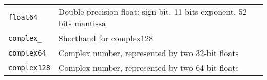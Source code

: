 \begin{table}
\begin{tabular}{ll}
        \verb|float64|    & Double-precision float: sign bit, 11 bits exponent, 52 bits mantissa                 \\
        \verb|complex_|   & Shorthand for complex128                                                             \\
        \verb|complex64|  & Complex number, represented by two 32-bit floats                                     \\
        \verb|complex128| & Complex number, represented by two 64-bit floats                                     \\
        \hline
    \end{tabular}
\end{table}